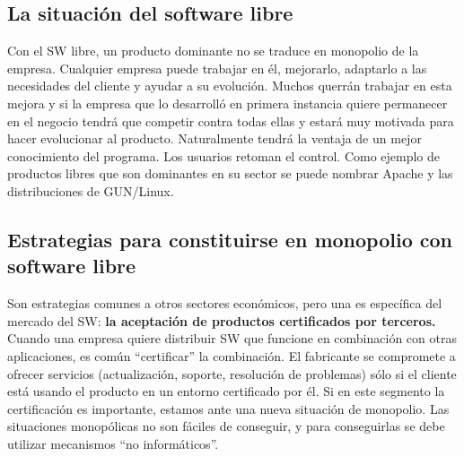\subsection{La situación del software libre}

Con el SW libre, un producto dominante no se traduce en monopolio de la empresa. Cualquier empresa puede trabajar en él, mejorarlo, adaptarlo a las necesidades del cliente y ayudar a su evolución. Muchos querrán trabajar en esta mejora y si la empresa que lo desarrolló en primera instancia quiere permanecer en el negocio tendrá que competir contra todas ellas y estará muy motivada para hacer evolucionar al producto. Naturalmente tendrá la ventaja de un mejor conocimiento del programa. 
Los usuarios retoman el control.
Como ejemplo de productos libres que son dominantes en su sector se puede nombrar Apache y las distribuciones de GUN/Linux.

\subsection{Estrategias para constituirse en monopolio con software libre}

Son estrategias comunes a otros sectores económicos, pero una es específica del mercado del SW: {\bf la aceptación de productos certificados por terceros.}
Cuando una empresa quiere distribuir SW que funcione en combinación con otras aplicaciones, es común “certificar” la combinación. El fabricante se compromete a ofrecer servicios (actualización, soporte, resolución de problemas) sólo si el cliente está usando el producto en un entorno certificado por él. Si en este segmento la certificación es importante, estamos ante una nueva situación de monopolio.
Las situaciones monopólicas no son fáciles de conseguir, y para conseguirlas se debe utilizar mecanismos “no informáticos”.



